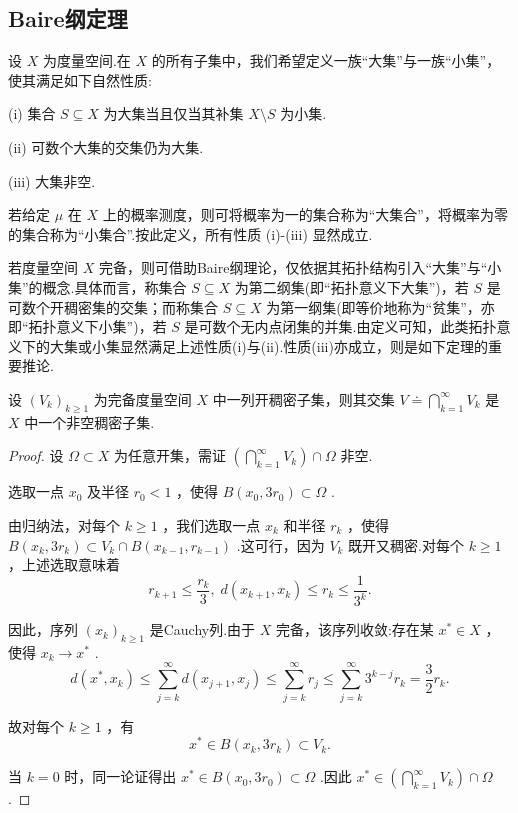 \subsection{Baire纲定理}设 $X$ 为度量空间.在 $X$ 的所有子集中，我们希望定义一族“大集”与一族“小集”，使其满足如下自然性质:

(i) 集合 $S \subseteq  X$ 为大集当且仅当其补集 $X \setminus  S$ 为小集.

(ii) 可数个大集的交集仍为大集.

(iii) 大集非空.

若给定 $\mu$ 在 $X$ 上的概率测度，则可将概率为一的集合称为“大集合”，将概率为零的集合称为“小集合”.按此定义，所有性质 (i)-(iii) 显然成立.

若度量空间 $X$ 完备，则可借助Baire纲理论，仅依据其拓扑结构引入“大集”与“小集”的概念.具体而言，称集合 $S \subseteq  X$ 为第二纲集(即“拓扑意义下大集”)，若 $S$ 是可数个开稠密集的交集；而称集合 $S \subseteq  X$ 为第一纲集(即等价地称为“贫集”，亦即“拓扑意义下小集”)，若 $S$ 是可数个无内点闭集的并集.由定义可知，此类拓扑意义下的大集或小集显然满足上述性质(i)与(ii).性质(iii)亦成立，则是如下定理的重要推论.

\begin{theorem}[Baire]\label{thm:app-A-5}
设 ${\left( {V}_{k}\right) }_{k \geq  1}$ 为完备度量空间 $X$ 中一列开稠密子集，则其交集 $V \doteq  \mathop{\bigcap }\limits_{{k = 1}}^{\infty }{V}_{k}$ 是 $X$ 中一个非空稠密子集.
\end{theorem}

\begin{proof}
设 $\Omega  \subset  X$ 为任意开集，需证 $\left( {\mathop{\bigcap }\limits_{{k = 1}}^{\infty }{V}_{k}}\right)  \cap  \Omega$ 非空.

选取一点 ${x}_{0}$ 及半径 ${r}_{0} < 1$ ，使得 $B\left( {{x}_{0},3{r}_{0}}\right)  \subset  \Omega$ .

由归纳法，对每个 $k \geq  1$ ，我们选取一点 ${x}_{k}$ 和半径 ${r}_{k}$ ，使得 $B\left( {{x}_{k},3{r}_{k}}\right)  \subset  {V}_{k} \cap  B\left( {{x}_{k - 1},{r}_{k - 1}}\right)$ .这可行，因为 ${V}_{k}$ 既开又稠密.对每个 $k \geq  1$ ，上述选取意味着
\[
{r}_{k + 1} \leq  \frac{{r}_{k}}{3},\;d\left( {{x}_{k + 1},{x}_{k}}\right)  \leq  {r}_{k} \leq  \frac{1}{{3}^{k}}.
\]

因此，序列 ${\left( {x}_{k}\right) }_{k \geq  1}$ 是Cauchy列.由于 $X$ 完备，该序列收敛:存在某 ${x}^{ * } \in  X$ ，使得 ${x}_{k} \rightarrow  {x}^{ * }$ .
\[
d\left( {{x}^{ * },{x}_{k}}\right)  \leq  \sum_{{j = k}}^{\infty }d\left( {{x}_{j + 1},{x}_{j}}\right)  \leq  \sum_{{j = k}}^{\infty }{r}_{j} \leq  \sum_{{j = k}}^{\infty }{3}^{k - j}{r}_{k} = \frac{3}{2}{r}_{k}.
\]

故对每个 $k \geq  1$ ，有
\[
{x}^{ * } \in  B\left( {{x}_{k},3{r}_{k}}\right)  \subset  {V}_{k}.
\]

当 $k = 0$ 时，同一论证得出 ${x}^{ * } \in  B\left( {{x}_{0},3{r}_{0}}\right)  \subset  \Omega$ .因此 ${x}^{ * } \in  \left( {\mathop{\bigcap }\limits_{{k = 1}}^{\infty }{V}_{k}}\right)  \cap  \Omega$.
\end{proof}

